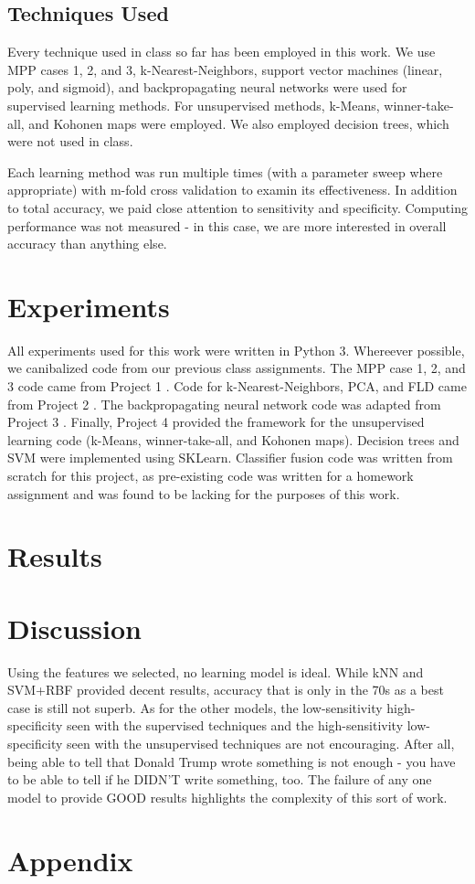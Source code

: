 \documentclass[letter,11pt,titlepage]{article}
\begin{document}
\subsection{Techniques Used}

Every technique used in class so far has been employed in this work. We use MPP cases 1, 2, and 3, k-Nearest-Neighbors, support vector machines (linear, poly, and sigmoid), and backpropagating neural networks were used for supervised learning methods. For unsupervised methods, k-Means, winner-take-all, and Kohonen maps were employed. We also employed decision trees, which were not used in class.

Each learning method was run multiple times (with a parameter sweep where appropriate) with m-fold cross validation to examin its effectiveness. In addition to total accuracy, we paid close attention to sensitivity and specificity. Computing performance was not measured - in this case, we are more interested in overall accuracy than anything else.

\section{Experiments}

All experiments used for this work were written in Python 3. Whereever possible, we canibalized code from our previous class assignments. The MPP case 1, 2, and 3 code came from  Project 1 \cite{Project1}. Code for k-Nearest-Neighbors, PCA, and FLD came from Project 2 \cite{Project2}. The backpropagating neural network code was adapted from Project 3 \cite{Project3}. Finally, Project 4 \cite{Project4} provided the framework for the unsupervised learning code (k-Means, winner-take-all, and Kohonen maps). Decision trees and SVM were implemented using SKLearn. Classifier fusion code was written from scratch for this project, as pre-existing code was written for a homework assignment and was found to be lacking for the purposes of this work.

\section{Results}

\section{Discussion}

Using the features we selected, no learning model is ideal. While kNN and SVM+RBF provided decent results, accuracy that is only in the 70s as a best case is still not superb. As for the other models, the low-sensitivity high-specificity seen with the supervised techniques and the high-sensitivity low-specificity seen with the unsupervised techniques are not encouraging. After all, being able to tell that Donald Trump wrote something is not enough - you have to be able to tell if he DIDN'T write something, too. The failure of any one model to provide GOOD results highlights the complexity of this sort of work.

\section{Appendix}

\clearpage


\end{document}

